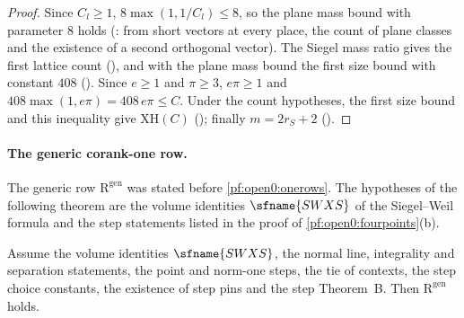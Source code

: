 \begin{proof}
Since $C_l\ge1$, $8\max(1,1/C_l)\le8$, so the plane mass bound with parameter $8$ holds
(: from short vectors at every place, the count of plane classes
and the existence of a second orthogonal vector). The Siegel mass ratio gives the first lattice count
(), and with the plane mass bound the first size bound with
constant $408$ (). Since $e\ge1$ and $\pi\ge3$, $e\pi\ge1$ and
$408\max(1,e\pi)=408\,e\pi\le C$. Under the count hypotheses, the first size bound and this inequality give $\mathrm{XH}(C)$
(); finally $m=2r_S+2$ ().
\end{proof}

\paragraph{The generic corank-one row.}
The generic row $\mathrm{R}^{\mathrm{gen}}$ was stated before \cref{pf:open0:onerows}. The hypotheses of the following theorem are the
volume identities $\sfname{SWXS}$ of the Siegel--Weil formula and the step statements listed in the proof of
\cref{pf:open0:fourpoints}(b).

\begin{theorem}\label{pf:open0:gen1}
Assume the volume identities $\sfname{SWXS}$, the normal line, integrality and separation statements, the point and norm-one steps, the
tie of contexts, the step choice constants, the existence of step pins and the step Theorem~B. Then $\mathrm{R}^{\mathrm{gen}}$ holds.
\end{theorem}

